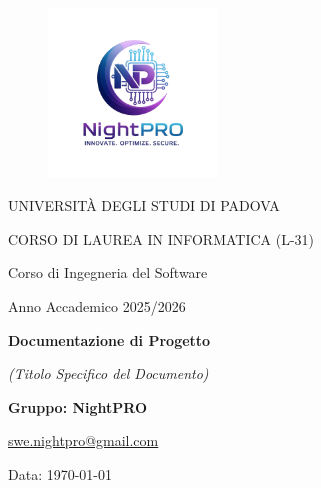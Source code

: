 \documentclass[a4paper, 11pt, oneside]{scrartcl} %
\begin{document}
\thispagestyle{empty}
\begin{titlepage}
    \centering
    
\begin{figure}
    \centering
    \includegraphics[width=0.4\textwidth]{logo.jpg}
\end{figure}

    \vfill
    
    {\small UNIVERSITÀ DEGLI STUDI DI PADOVA \par}
    {\small CORSO DI LAUREA IN INFORMATICA (L-31) \par}
    \vspace{0.5cm}
    {\large Corso di Ingegneria del Software \par}
    {\small Anno Accademico 2025/2026 \par}


    
    \vfill
    
    {\Huge \bfseries Documentazione di Progetto \par}
    
    \vspace{1cm}
    
    {\Large \itshape (Titolo Specifico del Documento) \par} 
    
    \vfill
    
    {\Large \bfseries Gruppo: NightPRO \par}
    \vspace{0.5cm}
    {\large \href{mailto:swe.nightpro@gmail.com}{swe.nightpro@gmail.com} \par}
    
    \vfill
    
    {\large Data: \today \par}

\end{titlepage}
\end{document}
